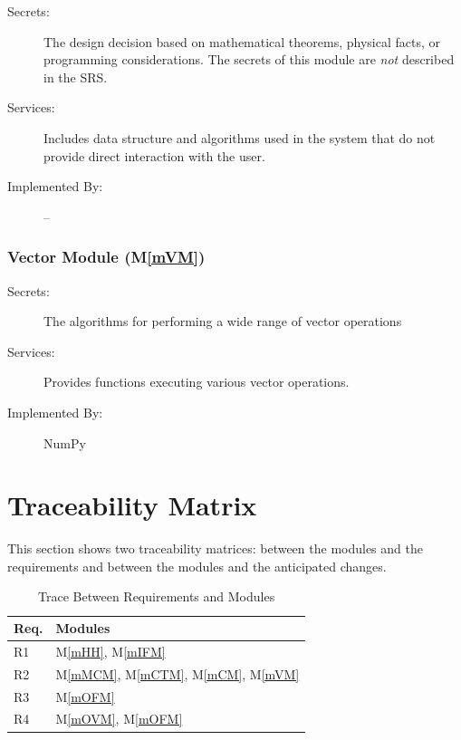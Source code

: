 \documentclass[12pt, titlepage]{article}
\newcommand{\mref}[1]{M\ref{#1}}
\begin{document}
\begin{description}
\item[Secrets:] The design decision based on mathematical theorems, physical
  facts, or programming considerations. The secrets of this module are
  \emph{not} described in the SRS.
\item[Services:] Includes data structure and algorithms used in the system that
  do not provide direct interaction with the user. 
\item[Implemented By:] --
\end{description}

\subsubsection{Vector Module (\mref{mVM})}

\begin{description}
\item[Secrets:]The algorithms for performing a wide range of vector operations
\item[Services:]Provides functions executing various vector operations.
\item[Implemented By:] NumPy
\end{description}


\section{Traceability Matrix} \label{SecTM}

This section shows two traceability matrices: between the modules and the
requirements and between the modules and the anticipated changes.

\begin{table}[H]
\centering
\begin{tabular}{p{} p{}}
\toprule
\textbf{Req.} & \textbf{Modules}\\
\midrule
R1 & \mref{mHH}, \mref{mIFM}\\
R2 & \mref{mMCM}, \mref{mCTM}, \mref{mCM}, \mref{mVM}\\
R3 & \mref{mOFM}\\
R4 & \mref{mOVM}, \mref{mOFM}\\

\bottomrule
\end{tabular}
\caption{Trace Between Requirements and Modules}
\label{TblRT}
\end{table}
\end{document}
